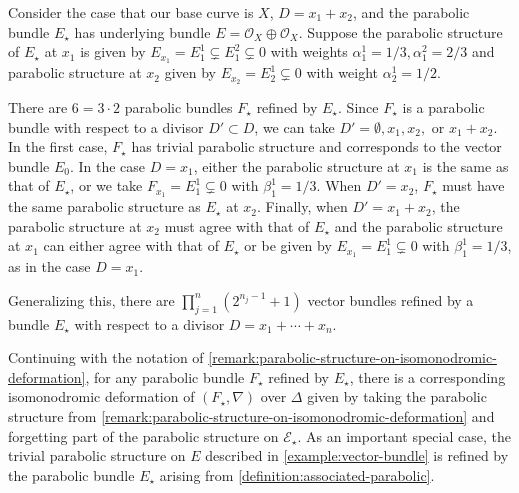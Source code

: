\begin{example}
\notready
	\label{example:refinement}
	Consider the case that our base curve is $X$, $D = x_1 + x_2$, and
	the parabolic bundle $E_\star$ has underlying bundle $E = \mathscr O_X
	\oplus \mathscr O_X$.
	Suppose the parabolic structure of $E_\star$ at $x_1$ is given by
	$E_{x_1} = E_1^1 \subsetneq E_1^2 \subsetneq 0$ with weights $\alpha_1^1
	= 1/3, \alpha_1^2 = 2/3$ and parabolic structure at $x_2$ given by $E_{x_2} = E_2^1 \subsetneq 0$ with weight
	$\alpha_2^1 = 1/2$.

	There are $6 = 3 \cdot 2$ parabolic bundles $F_\star$ refined by $E_\star$.
	Since $F_\star$ is a parabolic bundle with respect to a divisor $D'
	\subset D$, we can take $D' = \emptyset, x_1, x_2,$ or $x_1+
	x_2$. In the first case, $F_\star$ has trivial parabolic structure and
	corresponds to the vector bundle $E_0$. In the case $D = x_1$, either
	the parabolic structure at $x_1$ is the same as that of $E_\star$, or we take
	$F_{x_1} = E_1^1 \subsetneq 0$ with $\beta_1^1 = 1/3$.
	When $D' = x_2$, $F_\star$ must have the same parabolic structure as
	$E_\star$ at $x_2$. Finally, when $D' = x_1+ x_2$, the parabolic
	structure at $x_2$ must agree with that of $E_\star$ and the parabolic
	structure at $x_1$ can either agree with that of $E_\star$ or be given
	by $E_{x_1} = E_1^1 \subsetneq 0$ with $\beta_1^1 = 1/3$, as in the
	case $D = x_1$.

	Generalizing this, there are $\prod_{j=1}^n (2^{n_j-1}+1)$ vector bundles
	refined by a bundle $E_\star$ with respect to a divisor $D = x_1 +
	\cdots + x_n$.
\end{example}

\begin{remark}
\notready
	\label{remark:refinement}
	Continuing with the notation of
	\autoref{remark:parabolic-structure-on-isomonodromic-deformation},
	for any parabolic bundle $F_\star$ refined by $E_\star$,
	there is a corresponding
	isomonodromic deformation of $(F_\star,\nabla)$ over $\Delta$ given by taking the
	parabolic structure from
	\autoref{remark:parabolic-structure-on-isomonodromic-deformation}
	and forgetting
	part of the parabolic structure on $\mathscr{E}_\star$.
	As an important special case, the trivial parabolic structure on $E$ described in \autoref{example:vector-bundle} is refined by the parabolic bundle  $E_\star$ arising from \autoref{definition:associated-parabolic}.
\end{remark}


